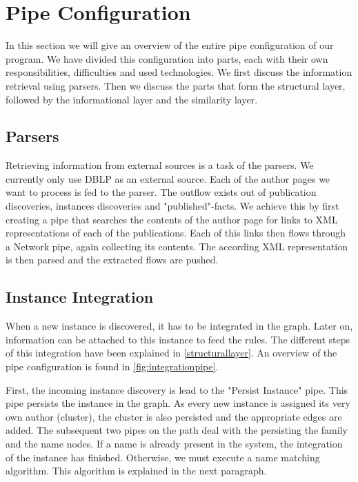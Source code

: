 \section{Pipe Configuration}

In this section we will give an overview of the entire pipe configuration of our program. We have divided this configuration into parts, each with their own responsibilities, difficulties and used technologies. We first discuss the information retrieval using parsers. Then we discuss the parts that form the structural layer, followed by the informational layer and the similarity layer.

\subsection{Parsers}

Retrieving information from external sources is a task of the parsers. We currently only use DBLP as an external source. Each of the author pages we want to process is fed to the parser. The outflow exists out of publication discoveries, instances discoveries and "published"-facts. We achieve this by first creating a pipe that searches the contents of the author page for links to XML representations of each of the publications. Each of this links then flows through a Network pipe, again collecting its contents. The according XML representation is then parsed and the extracted flows are pushed.

\subsection{Instance Integration}

When a new instance is discovered, it has to be integrated in the graph. Later on, information can be attached to this instance to feed the rules. The different steps of this integration have been explained in \autoref{structurallayer}. An overview of the pipe configuration is found in \autoref{fig:integrationpipe}.

First, the incoming instance discovery is lead to the "Persist Instance" pipe. This pipe persists the instance in the graph. As every new instance is assigned its very own author (cluster), the cluster is also persisted and the appropriate edges are added. The subsequent two pipes on the path deal with the persisting the family and the name nodes. If a name is already present in the system, the integration of the instance has finished. Otherwise, we must execute a name matching algorithm. This algorithm is explained in the next paragraph.

